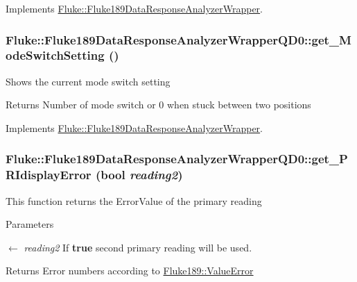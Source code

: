 Implements \hyperlink{classFluke_1_1Fluke189DataResponseAnalyzerWrapper_a258e56c1ff27b8aae648940599d3b475}{Fluke::Fluke189DataResponseAnalyzerWrapper}.\hypertarget{classFluke_1_1Fluke189DataResponseAnalyzerWrapperQD0_ad28a17399ffe6a926990aafd5a1891d3}{
\subsubsection[{get\_\-ModeSwitchSetting}]{ Fluke::Fluke189DataResponseAnalyzerWrapperQD0::get\_\-ModeSwitchSetting ()}}
\label{classFluke_1_1Fluke189DataResponseAnalyzerWrapperQD0_ad28a17399ffe6a926990aafd5a1891d3}
Shows the current mode switch setting \begin{DoxyReturn}{Returns}
Number of mode switch or 0 when stuck between two positions 
\end{DoxyReturn}


Implements \hyperlink{classFluke_1_1Fluke189DataResponseAnalyzerWrapper_a18e1b686e50a4cc3a7023c646f66a35c}{Fluke::Fluke189DataResponseAnalyzerWrapper}.\hypertarget{classFluke_1_1Fluke189DataResponseAnalyzerWrapperQD0_a4a3343d00db4cda2bf021074f2cfdadc}{
\subsubsection[{get\_\-PRIdisplayError}]{ Fluke::Fluke189DataResponseAnalyzerWrapperQD0::get\_\-PRIdisplayError (bool {\em reading2})}}
\label{classFluke_1_1Fluke189DataResponseAnalyzerWrapperQD0_a4a3343d00db4cda2bf021074f2cfdadc}
This function returns the ErrorValue of the primary reading 
\begin{DoxyParams}{Parameters}
\item[\mbox{$\leftarrow$} {\em reading2}]If {\bfseries true} second primary reading will be used. \end{DoxyParams}
\begin{DoxyReturn}{Returns}
Error numbers according to \hyperlink{classFluke_1_1Fluke189_a5dc0eaffde0a29a64cbcbd50d4178491}{Fluke189::ValueError} 
\end{DoxyReturn}


